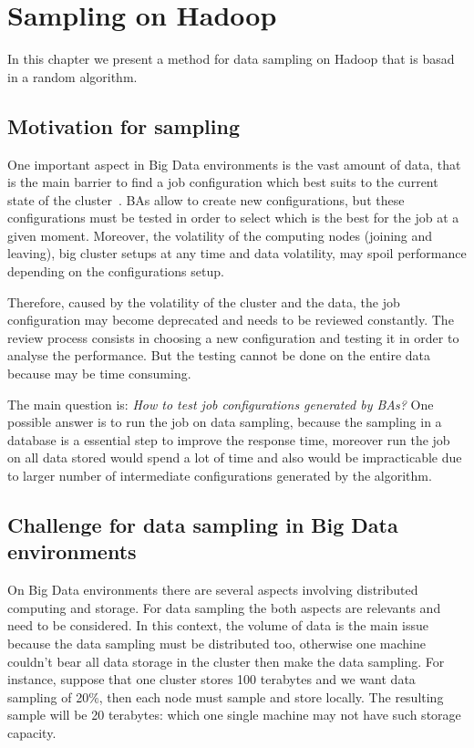 \chapter{Sampling on Hadoop} %
\label{cha:sample}

In this chapter we present a method for data sampling on Hadoop that is basad
in a random algorithm.

\section{Motivation for sampling}

One important aspect in Big Data environments is the vast amount of data,
that is the main barrier to find a job configuration which best suits to the
current state of the cluster~\cite{Chen:2012}. BAs allow to create new configurations,
but these configurations must be tested in order to select which is the best for
the job at a given moment. Moreover, the volatility of the computing nodes (joining and leaving),
big cluster setups at any time and data volatility, may spoil performance depending
on the configurations setup. 

Therefore, caused by the volatility of the cluster and the data, the job configuration
may become deprecated and needs to be reviewed constantly. The review process consists
in choosing a new configuration and testing it in order to analyse the performance.
But the testing cannot be done on the entire data because may be time consuming.

The main question is: {\it How to test job configurations generated by BAs?} One possible
answer is to run the job on data sampling, because the sampling in a database is
a essential step to improve the response time, moreover run the job on all data
stored would spend a lot of time and also would be impracticable due to larger number
of intermediate configurations generated by the algorithm.

\section{Challenge for data sampling in Big Data environments}

On Big Data environments there are several aspects involving distributed computing
and storage. For data sampling the both aspects are relevants and need to be considered.
In this context, the volume of data is the main issue because the data sampling must
be distributed too, otherwise one machine couldn't bear all data storage in the
cluster then make the data sampling. For instance, suppose that one cluster stores
100 terabytes and we want data sampling of 20$\%$, then each node must sample and
store locally. The resulting sample will be 20 terabytes: which one single machine
may not have such storage capacity.

